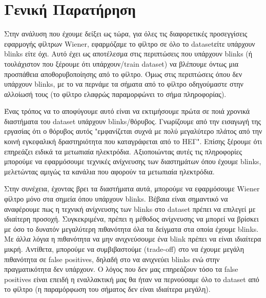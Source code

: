 \documentclass[12pt]{article} %
\begin{document}
\newpage

\section*{Γενική Παρατήρηση}

 Στην ανάλυση που έχουμε δείξει ως τώρα, για όλες τις διαφορετικές προσεγγίσεις εφαρμογής φίλτρων Wiener, εφαρμόζαμε το φίλτρο σε όλο το dataset\textemdash είτε υπάρχουν blinks είτε όχι. Αυτό έχει ως αποτέλεσμα στις περιπτώσεις που υπάρχουν blinks (ή τουλάχιστον που ξέρουμε ότι υπάρχουν/train dataset) να βλέπουμε όντως μια προσπάθεια αποθορυβοποίησης από το φίλτρο. Όμως στις περιπτώσεις όπου δεν υπάρχουν blinks, με το να περνάμε τα σήματα από το φίλτρο οδηγούμαστε στην αλλοίωσή τους (το φίλτρο ελαφρώς παραμορφώνει το σήμα πληροφορίας). 

 Ένας τρόπος να το αποφύγουμε αυτό είναι να εκτιμήσουμε πρώτα σε ποιά χρονικά διαστήματα του dataset υπάρχουν blinks/θόρυβος. Γνωρίζουμε από την εισαγωγή της εργασίας ότι ο θόρυβος αυτός "εμφανίζεται συχνά με πολύ μεγαλύτερο πλάτος από την κοινή εγκεφαλική δραστηριότητα που καταγράφεται από το ΗΕΓ". Επίσης ξέρουμε ότι επηρεάζει ειδικά τα μετωπιαία ηλεκτρόδια. Αξιοποιώντας αυτές τις πληροφορίες μπορούμε να εφαρμόσουμε τεχνικές ανίχνευσης των διαστημάτων όπου έχουμε blinks, μελετώντας αμιγώς τα κανάλια που αφορούν τα μετωπιαία ηλεκτρόδια. 

 Στην συνέχεια, έχοντας βρει τα διαστήματα αυτά, μπορούμε να εφαρμόσουμε Wiener φίλτρο μόνο στα σημεία όπου υπάρχουν blinks. Βέβαια είναι σημαντικό να αναφέρουμε πως η τεχνική ανίχνευσης των blinks στο dataset πρέπει να επιλεγεί με ιδιαίτερη προσοχή. Συγκεκριμένα, πρέπει η μέθοδος ανίχνευσης να μπορεί να βρίσκει με όσο το δυνατόν μεγαλύτερη πιθανότητα όλα τα δείγματα στα οποία έχουμε blinks. Με άλλα λόγια η πιθανότητα να μην ανιχνεύσουμε ένα blink πρέπει να είναι ιδιαίτερα μικρή. Αντίθετα, μπορούμε να συμβιβαστούμε (trade-off) στο να έχουμε μεγάλη πιθανότητα σε false positives, δηλαδή στο να ανιχνεύει blinks ενώ στην πραγματικότητα δεν υπάρχουν. Ο λόγος που δεν μας επηρεάζουν τόσο τα false positives είναι επειδή η εναλλακτική μας θα ήταν να περνούσαμε όλο το dataset από το φίλτρο (η παραμόρφωση του σήματος δεν είναι ιδιαίτερα μεγάλη). 
\end{document}
